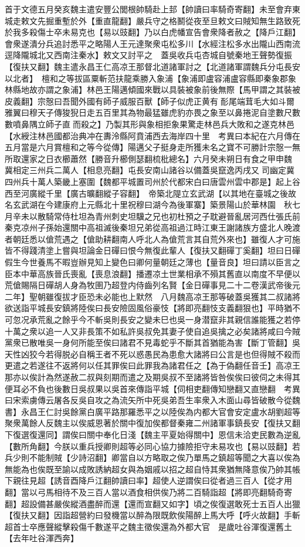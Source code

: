 首于文德五月癸亥魏主遣安豐公閭根帥騎赴上邽【帥讀曰率騎奇寄翻】未至會弃東城走敕文先掘重塹於外【重直龍翻】嚴兵守之格鬭從夜至旦敕文曰賊知無生路致死於我多殺傷士卒未易克也【易以豉翻】乃以白虎幡宣告會衆降者赦之【降戶江翻】會衆遂潰分兵追討悉平之略陽人王元達聚衆屯松多川【水經注松多水出隴山西南流逕降隴城北又西南注秦水】敕文又討平之　蓋吳收兵屯杏城自號秦地王聲勢復振【復扶又翻】魏主遣永昌王仁高凉王那督北道諸軍討之【北道諸軍謂魏兵分屯長安以北者】　檀和之等拔區粟斬范扶龍乘勝入象浦【象浦即盧容浦盧容縣即秦象郡象林縣地故亦謂之象浦】林邑王陽邁傾國來戰以具裝被象前後無際【馬甲謂之其裝被皮義翻】宗慤曰吾聞外國有師子威服百獸【師子似虎正黄有耏尾端茸毛大如斗爾雅翼曰穆天子傳狻猊日走五百里其為物最猛雖虎豹亦畏之象至以鼻捲泥自塗數尺數數噴鼻隅立師子直而殺之】乃製其形與象相拒象果驚走林邑兵大敗和之遂克林邑【水綬注林邑國都治典冲在夀泠縣阿賁浦西去海岸四十里　考異曰本紀在六月傳在五月當是六月賞檀和之等今從傳】陽邁父子挺身走所獲未名之寶不可勝計宗慤一無所取還家之日衣櫛蕭然【勝音升櫛側瑟翻梳枇總名】六月癸未朔日有食之甲申魏冀相定三州兵二萬人【相息亮翻】屯長安南山諸谷以備蓋吳竄逸丙戌又司幽定冀四州兵十萬人築畿上塞圍【魏都平城置司州於代都宋白曰唐雲州雲中郡是】起上谷西至河廣縱千里【廣古曠翻縱子容翻】　帝築北隄立玄武湖【以其地在臺城之後故名玄武湖在今建康府上元縣北十里祝穆曰湖今為後軍寨】築景陽山於華林園　秋七月辛未以散騎常侍杜坦為青州刺史坦驥之兄也初杜預之子耽避晉亂居河西仕張氏前秦克凉州子孫始還關中高祖滅後秦坦兄弟從高祖過江時江東王謝諸族方盛北人晚渡者朝廷悉以傖荒遇之【傖助耕翻南人呼北人為傖荒言其自荒外來也】雖復人才可施皆不得踐清塗上嘗與坦論金日磾曰恨今無復此輩人【復扶又翻磾丁奚翻】坦曰日磾假生今世養馬不暇豈辦見知上變色曰卿何量朝廷之薄也【量音良】坦曰請以臣言之臣本中華高族晉氏喪亂【喪息浪翻】播遷凉土世業相承不殞其舊直以南度不早便以荒傖賜隔日磾胡人身為牧圉乃超登内侍齒列名賢【金日磾事見二十二卷漢武帝後元二年】聖朝雖復拔才臣恐未必能也上默然　八月魏高凉王那等破蓋吳獲其二叔諸將欲送詣平城長安鎮將陸俟曰長安險固風俗豪忮【將即亮翻忮支義翻狠也】平時猶不可忽况承荒亂之餘乎今不斬吳則長安之變未巳也吳一身潜竄非其親信誰能獲之若停十萬之衆以追一人又非長策不如私許吳叔免其妻子使自追吳擒之必矣諸將咸曰今賊黨衆已散唯吳一身何所能至俟曰諸君不見毒蛇乎不斷其首猶能為害【斷丁管翻】吳天性凶狡今若得脱必自稱王者不死以惑愚民為患愈大諸將曰公言是也但得賊不殺而更遣之若遂往不返將何以任其罪俟曰此罪我為諸君任之【為于偽翻任音壬】高凉王那亦以俟計為然遂赦二叔與刻期而遣之及期吳叔不至諸將皆咎俟俟曰彼伺之未得其便耳必不負也後數日吳叔果以吳首來傳詣平城【伺相吏翻傳知戀翻又直戀翻　考異曰宋索虜傳云屠各反吳自攻之為流矢所中死吳弟吾生率衆入木面山尋皆破散今從魏書】永昌王仁討吳餘黨白廣平路那羅悉平之以陸俟為内都大官會安定盧水胡劉超等聚衆萬餘人反魏主以俟威恩著於關中復加俟都督秦雍二州諸軍事鎮長安【復扶又翻下復選復還同】謂俟曰關中奉化日淺【魏主平夏始得關中】恩信未洽吏民數為逆亂【數所角翻】今朕以重兵授卿則超等必同心協力據險拒守未易攻也【易以豉翻】若兵少則不能制賊【少詩沼翻】卿當自以方略取之俟乃單馬之鎮超等聞之大喜以俟為無能為也俟既至諭以成敗誘納超女與為姻戚以招之超自恃其衆猶無降意俟乃帥其帳下親往見超【誘音酉降戶江翻帥讀曰率】超使人逆謂俟曰從者過三百人【從才用翻】當以弓馬相待不及三百人當以酒食相供俟乃將二百騎詣超【將即亮翻騎奇寄翻】超設備甚嚴俟縱酒盡醉而還【還而宣翻又如字】頃之俟復選敢死士五百人出獵【復扶又翻】因詣超營約曰發機當以醉為限既飲俟陽醉上馬大呼【呼火故翻】手斬超首士卒應聲縱擊殺傷千數遂平之魏主徵俟還為外都大官　是歲吐谷渾復還舊土【去年吐谷渾西奔】

